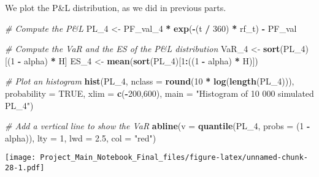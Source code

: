 \documentclass[]{article}
\newenvironment{Shaded}{\begin{snugshade}}{\end{snugshade}}
\newcommand{\CommentTok}[1]{\textcolor[rgb]{0.56,0.35,0.01}{\textit{#1}}}
\newcommand{\DataTypeTok}[1]{\textcolor[rgb]{0.13,0.29,0.53}{#1}}
\newcommand{\DecValTok}[1]{\textcolor[rgb]{0.00,0.00,0.81}{#1}}
\newcommand{\FloatTok}[1]{\textcolor[rgb]{0.00,0.00,0.81}{#1}}
\newcommand{\KeywordTok}[1]{\textcolor[rgb]{0.13,0.29,0.53}{\textbf{#1}}}
\newcommand{\NormalTok}[1]{#1}
\newcommand{\OperatorTok}[1]{\textcolor[rgb]{0.81,0.36,0.00}{\textbf{#1}}}
\newcommand{\OtherTok}[1]{\textcolor[rgb]{0.56,0.35,0.01}{#1}}
\newcommand{\StringTok}[1]{\textcolor[rgb]{0.31,0.60,0.02}{#1}}
\begin{document}
We plot the P\&L distribution, as we did in previous parts.

\begin{Shaded}
\begin{Highlighting}[]
\CommentTok{\# Compute the P\&L}
\NormalTok{PL\_}\DecValTok{4}\NormalTok{ <{-}}\StringTok{ }\NormalTok{PF\_val\_}\DecValTok{4} \OperatorTok{*}\StringTok{ }\KeywordTok{exp}\NormalTok{(}\OperatorTok{{-}}\NormalTok{(t }\OperatorTok{/}\StringTok{ }\DecValTok{360}\NormalTok{) }\OperatorTok{*}\StringTok{ }\NormalTok{rf\_t) }\OperatorTok{{-}}\StringTok{ }\NormalTok{PF\_val}

\CommentTok{\# Compute the VaR and the ES of the P\&L distribution}
\NormalTok{VaR\_}\DecValTok{4}\NormalTok{ <{-}}\StringTok{ }\KeywordTok{sort}\NormalTok{(PL\_}\DecValTok{4}\NormalTok{)[(}\DecValTok{1} \OperatorTok{{-}}\StringTok{ }\NormalTok{alpha) }\OperatorTok{*}\StringTok{ }\NormalTok{H]}
\NormalTok{ES\_}\DecValTok{4}\NormalTok{  <{-}}\StringTok{ }\KeywordTok{mean}\NormalTok{(}\KeywordTok{sort}\NormalTok{(PL\_}\DecValTok{4}\NormalTok{)[}\DecValTok{1}\OperatorTok{:}\NormalTok{((}\DecValTok{1} \OperatorTok{{-}}\StringTok{ }\NormalTok{alpha) }\OperatorTok{*}\StringTok{ }\NormalTok{H)])}

\CommentTok{\# Plot an histogram}
\KeywordTok{hist}\NormalTok{(PL\_}\DecValTok{4}\NormalTok{, }\DataTypeTok{nclass =} \KeywordTok{round}\NormalTok{(}\DecValTok{10} \OperatorTok{*}\StringTok{ }\KeywordTok{log}\NormalTok{(}\KeywordTok{length}\NormalTok{(PL\_}\DecValTok{4}\NormalTok{))), }
           \DataTypeTok{probability =} \OtherTok{TRUE}\NormalTok{, }\DataTypeTok{xlim =} \KeywordTok{c}\NormalTok{(}\OperatorTok{{-}}\DecValTok{200}\NormalTok{,}\DecValTok{600}\NormalTok{),}
           \DataTypeTok{main =} \StringTok{"Histogram of 10 000 simulated PL\_4"}\NormalTok{)}

\CommentTok{\# Add a vertical line to show the VaR}
\KeywordTok{abline}\NormalTok{(}\DataTypeTok{v   =} \KeywordTok{quantile}\NormalTok{(PL\_}\DecValTok{4}\NormalTok{, }\DataTypeTok{probs =}\NormalTok{ (}\DecValTok{1} \OperatorTok{{-}}\StringTok{ }\NormalTok{alpha)),}
       \DataTypeTok{lty =} \DecValTok{1}\NormalTok{,}
       \DataTypeTok{lwd =} \FloatTok{2.5}\NormalTok{,}
       \DataTypeTok{col =} \StringTok{"red"}\NormalTok{)}
\end{Highlighting}
\end{Shaded}

\texttt{[image: Project\_Main\_Notebook\_Final\_files/figure-latex/unnamed-chunk-28-1.pdf]}
\end{document}

